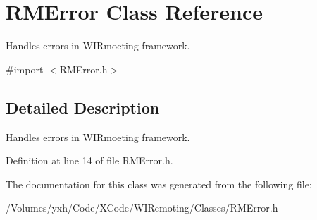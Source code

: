 \hypertarget{interface_r_m_error}{
\section{RMError Class Reference}
\label{interface_r_m_error}
}


Handles errors in WIRmoeting framework.  


{\ttfamily \#import $<$RMError.h$>$}

\subsection{Detailed Description}
Handles errors in WIRmoeting framework. 

Definition at line 14 of file RMError.h.

The documentation for this class was generated from the following file:\begin{DoxyCompactItemize}
\item 
/Volumes/yxh/Code/XCode/WIRemoting/Classes/RMError.h\end{DoxyCompactItemize}
